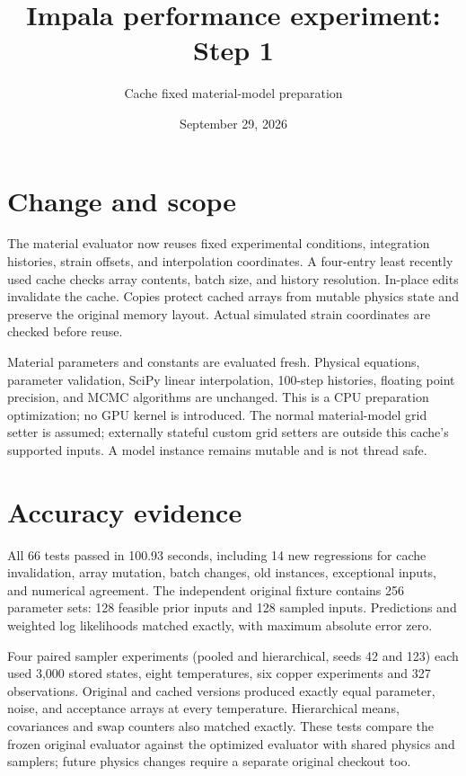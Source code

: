 \documentclass[11pt]{article}
\title{Impala performance experiment: Step 1}
\author{Cache fixed material-model preparation}
\date{September 29, 2026}
\begin{document}
\maketitle
\section*{Change and scope}
The material evaluator now reuses fixed experimental conditions, integration
histories, strain offsets, and interpolation coordinates. A four-entry least
recently used cache checks array contents, batch size, and history resolution.
In-place edits invalidate the cache. Copies protect cached arrays from mutable
physics state and preserve the original memory layout. Actual simulated strain
coordinates are checked before reuse.

Material parameters and constants are evaluated fresh. Physical equations,
parameter validation, SciPy linear interpolation, 100-step histories, floating
point precision, and MCMC algorithms are unchanged. This is a CPU preparation
optimization; no GPU kernel is introduced. The normal material-model grid setter
is assumed; externally stateful custom grid setters are outside this cache's
supported inputs. A model instance remains mutable and is not thread safe.
\section*{Accuracy evidence}
All 66 tests passed in 100.93 seconds, including 14 new regressions for cache
invalidation, array mutation, batch changes, old instances, exceptional inputs,
and numerical agreement. The independent original fixture contains 256 parameter
sets: 128 feasible prior inputs and 128 sampled inputs. Predictions and weighted
log likelihoods matched exactly, with maximum absolute error zero.

Four paired sampler experiments (pooled and hierarchical, seeds 42 and 123)
each used 3,000 stored states, eight temperatures, six copper experiments and
327 observations. Original and cached versions produced exactly equal parameter,
noise, and acceptance arrays at every temperature. Hierarchical means,
covariances and swap counters also matched exactly. These tests compare the
frozen original evaluator against the optimized evaluator with shared physics
and samplers; future physics changes require a separate original checkout too.
\end{document}
